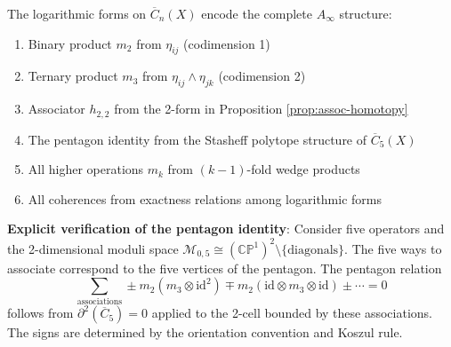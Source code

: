 \begin{theorem}\label{thm:homotopy-complete}
The logarithmic forms on $\overline{C}_n(X)$ encode the complete $A_\infty$ structure:
\begin{enumerate}
\item Binary product $m_2$ from $\eta_{ij}$ (codimension 1)
\item Ternary product $m_3$ from $\eta_{ij} \wedge \eta_{jk}$ (codimension 2)  
\item Associator $h_{2,2}$ from the 2-form in Proposition \ref{prop:assoc-homotopy}
\item The pentagon identity from the Stasheff polytope structure of $\overline{C}_5(X)$
\item All higher operations $m_k$ from $(k-1)$-fold wedge products
\item All coherences from exactness relations among logarithmic forms
\end{enumerate}

\begin{remark}\textbf{Explicit verification of the pentagon identity}: Consider five operators and the
2-dimensional moduli space $\mathcal{M}_{0,5} \cong (\mathbb{CP}^1)^2 \setminus \{\text{diagonals}\}$. 
The five ways to associate correspond to the five vertices of the pentagon. The pentagon relation
$$\sum_{\text{associations}} \pm m_2(m_3 \otimes \text{id}^2) \mp m_2(\text{id} \otimes m_3 \otimes \text{id}) \pm \cdots = 0$$
follows from $\partial^2(\overline{C}_5) = 0$ applied to the 2-cell bounded by these associations.
The signs are determined by the orientation convention and Koszul rule.\end{remark}

\end{theorem}
 
